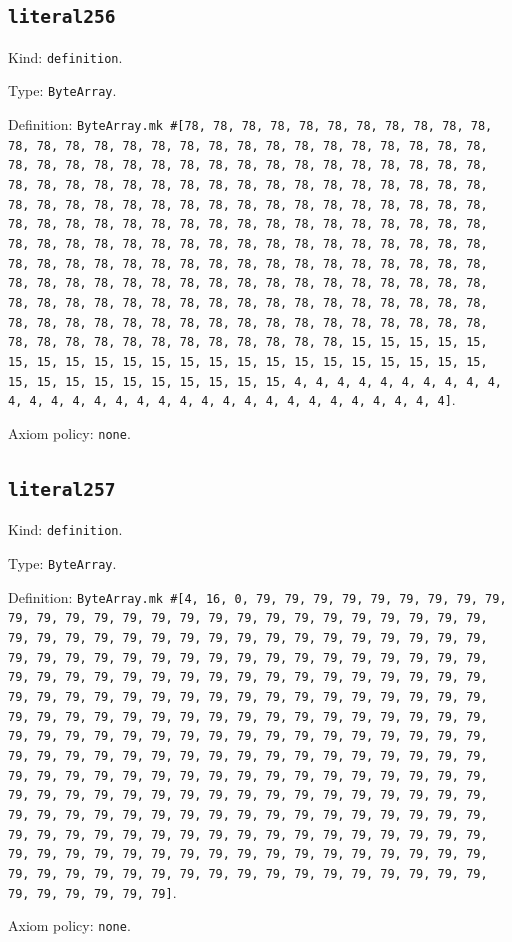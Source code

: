 \documentclass[11pt]{article}
\begin{document}
\subsection*{\texttt{literal256}}
\noindent Kind: \texttt{definition}.\par
\noindent Type: \texttt{ByteArray}.\par
\noindent Definition: \texttt{ByteArray.mk \#[78, 78, 78, 78, 78, 78, 78, 78, 78, 78, 78, 78, 78, 78, 78, 78, 78, 78, 78, 78, 78, 78, 78, 78, 78, 78, 78, 78, 78, 78, 78, 78, 78, 78, 78, 78, 78, 78, 78, 78, 78, 78, 78, 78, 78, 78, 78, 78, 78, 78, 78, 78, 78, 78, 78, 78, 78, 78, 78, 78, 78, 78, 78, 78, 78, 78, 78, 78, 78, 78, 78, 78, 78, 78, 78, 78, 78, 78, 78, 78, 78, 78, 78, 78, 78, 78, 78, 78, 78, 78, 78, 78, 78, 78, 78, 78, 78, 78, 78, 78, 78, 78, 78, 78, 78, 78, 78, 78, 78, 78, 78, 78, 78, 78, 78, 78, 78, 78, 78, 78, 78, 78, 78, 78, 78, 78, 78, 78, 78, 78, 78, 78, 78, 78, 78, 78, 78, 78, 78, 78, 78, 78, 78, 78, 78, 78, 78, 78, 78, 78, 78, 78, 78, 78, 78, 78, 78, 78, 78, 78, 78, 78, 78, 78, 78, 78, 78, 78, 78, 78, 78, 78, 78, 78, 78, 78, 78, 78, 78, 78, 78, 78, 78, 78, 78, 78, 78, 78, 78, 78, 78, 78, 78, 15, 15, 15, 15, 15, 15, 15, 15, 15, 15, 15, 15, 15, 15, 15, 15, 15, 15, 15, 15, 15, 15, 15, 15, 15, 15, 15, 15, 15, 15, 15, 15, 4, 4, 4, 4, 4, 4, 4, 4, 4, 4, 4, 4, 4, 4, 4, 4, 4, 4, 4, 4, 4, 4, 4, 4, 4, 4, 4, 4, 4, 4, 4]}.\par
\noindent Axiom policy: \texttt{none}.\par
\subsection*{\texttt{literal257}}
\noindent Kind: \texttt{definition}.\par
\noindent Type: \texttt{ByteArray}.\par
\noindent Definition: \texttt{ByteArray.mk \#[4, 16, 0, 79, 79, 79, 79, 79, 79, 79, 79, 79, 79, 79, 79, 79, 79, 79, 79, 79, 79, 79, 79, 79, 79, 79, 79, 79, 79, 79, 79, 79, 79, 79, 79, 79, 79, 79, 79, 79, 79, 79, 79, 79, 79, 79, 79, 79, 79, 79, 79, 79, 79, 79, 79, 79, 79, 79, 79, 79, 79, 79, 79, 79, 79, 79, 79, 79, 79, 79, 79, 79, 79, 79, 79, 79, 79, 79, 79, 79, 79, 79, 79, 79, 79, 79, 79, 79, 79, 79, 79, 79, 79, 79, 79, 79, 79, 79, 79, 79, 79, 79, 79, 79, 79, 79, 79, 79, 79, 79, 79, 79, 79, 79, 79, 79, 79, 79, 79, 79, 79, 79, 79, 79, 79, 79, 79, 79, 79, 79, 79, 79, 79, 79, 79, 79, 79, 79, 79, 79, 79, 79, 79, 79, 79, 79, 79, 79, 79, 79, 79, 79, 79, 79, 79, 79, 79, 79, 79, 79, 79, 79, 79, 79, 79, 79, 79, 79, 79, 79, 79, 79, 79, 79, 79, 79, 79, 79, 79, 79, 79, 79, 79, 79, 79, 79, 79, 79, 79, 79, 79, 79, 79, 79, 79, 79, 79, 79, 79, 79, 79, 79, 79, 79, 79, 79, 79, 79, 79, 79, 79, 79, 79, 79, 79, 79, 79, 79, 79, 79, 79, 79, 79, 79, 79, 79, 79, 79, 79, 79, 79, 79, 79, 79, 79, 79, 79, 79, 79, 79, 79, 79, 79, 79, 79, 79, 79, 79, 79, 79, 79, 79, 79, 79, 79, 79]}.\par
\noindent Axiom policy: \texttt{none}.\par
\end{document}
